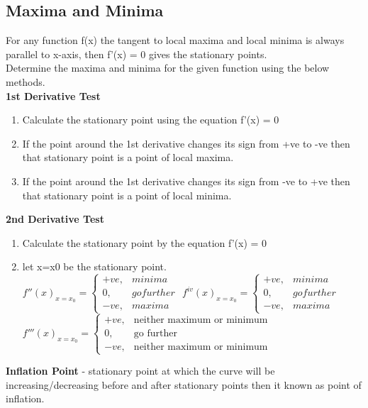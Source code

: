 \subsection{Maxima and Minima}
For any function f(x) the tangent to local maxima and local minima is always parallel to x-axis, then f'(x) = 0 gives the stationary points.\\
Determine the maxima and minima for the given function using the below methods.\\
\textbf{1st Derivative Test}
\begin{enumerate}
    \item Calculate the stationary point using the equation f'(x) = 0
    \item If the point around the 1st derivative changes its sign from +ve to -ve then that stationary point is a point of local maxima.
    \item If the point around the 1st derivative changes its sign from -ve to +ve then that stationary point is a point of local minima.
\end{enumerate}
\textbf{2nd Derivative Test}
\begin{enumerate}
    \item Calculate the stationary point by the equation f'(x) = 0
    \item let x=x0 be the stationary point.\vspace{0.2cm}\\
    \( f''(x)_{x=x_0} = 
    \begin{cases}
        +ve, & minima\\
        0,   & go further\\
        -ve, & maxima
    \end{cases} \)\hspace{1cm}
    \( f^{iv}(x)_{x=x_0} = 
    \begin{cases}
        +ve, & minima\\
        0,   & go further\\
        -ve, & maxima
    \end{cases} \)\vspace{0.2cm}\\
    \( f'''(x)_{x=x_0} = 
    \begin{cases}
        +ve, & \text{neither maximum or minimum}\\
        0,   & \text{go further}\\
        -ve, & \text{neither maximum or minimum}
    \end{cases} \)
\end{enumerate}
\textbf{Inflation Point} - stationary point at which the curve will be increasing/decreasing before and after stationary points then it known as point of inflation.

